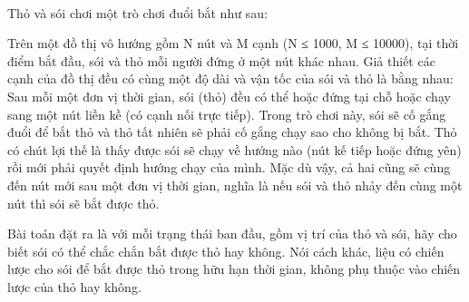  

Thỏ và sói chơi một trò chơi đuổi bắt như sau:

Trên một đồ thị vô hướng gồm N nút và M cạnh (N ≤ 1000, M ≤ 10000), tại thời điểm bắt đầu, sói và thỏ mỗi người đứng ở một nút khác nhau. Giả thiết các cạnh của đồ thị đều có cùng một độ dài và vận tốc của sói và thỏ là bằng nhau: Sau mỗi một đơn vị thời gian, sói (thỏ) đều có thể hoặc đứng tại chỗ hoặc chạy sang một nút liền kề (có cạnh nối trực tiếp). Trong trò chơi này, sói sẽ cố gắng đuổi để bắt thỏ và thỏ tất nhiên sẽ phải cố gắng chạy sao cho không bị bắt. Thỏ có chút lợi thế là thấy được sói sẽ chạy về hướng nào (nút kế tiếp hoặc đứng yên) rồi mới phải quyết định hướng chạy của mình. Mặc dù vậy, cả hai cũng sẽ cùng đến nút mới sau một đơn vị thời gian, nghĩa là nếu sói và thỏ nhảy đến cùng một nút thì sói sẽ bắt được thỏ.

Bài toán đặt ra là với mỗi trạng thái ban đầu, gồm vị trí của thỏ và sói, hãy cho biết sói có thể chắc chắn bắt được thỏ hay không. Nói cách khác, liệu có chiến lược cho sói để bắt được thỏ trong hữu hạn thời gian, không phụ thuộc vào chiến lược của thỏ hay không.